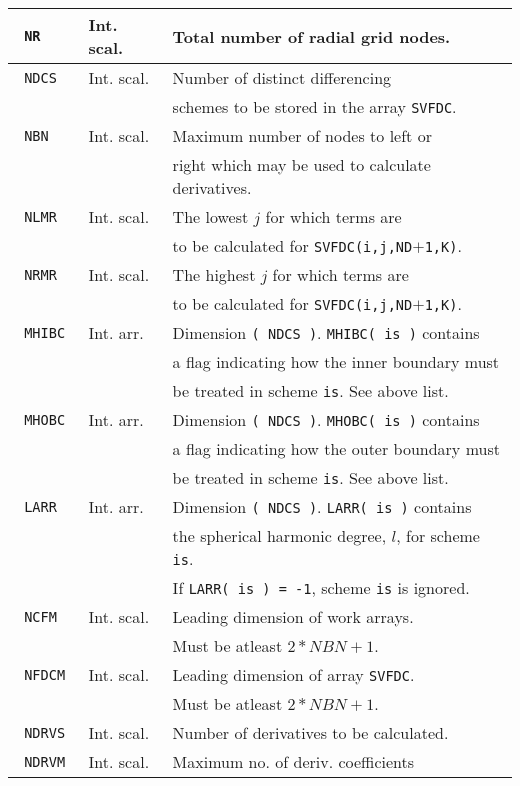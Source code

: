 \begin{tabular}{|l|l|l|}
\hline
\verb+ NR + & Int. scal. & Total number of radial grid nodes. \\
\hline
\verb+ NDCS + & Int. scal. & Number of distinct differencing \\
& & schemes to be stored in the array \verb+SVFDC+. \\
\hline
\verb+ NBN + & Int. scal. & Maximum number of nodes to left or \\
& & right which may be used to calculate derivatives. \\
\hline
\verb+ NLMR + & Int. scal. & The lowest $j$ for which terms are \\
& & to be calculated for \verb+SVFDC(i,j,ND+$+$\verb+1,K)+. \\
\hline
\verb+ NRMR + & Int. scal. & The highest $j$ for which terms are \\
& & to be calculated for \verb+SVFDC(i,j,ND+$+$\verb+1,K)+. \\
\hline
\verb+ MHIBC + & Int. arr. & Dimension \verb+( NDCS )+. \verb+MHIBC( is )+
contains \\
& & a flag indicating how the inner boundary must \\
& & be treated in scheme \verb+is+. See above list. \\
\hline
\verb+ MHOBC + & Int. arr. & Dimension \verb+( NDCS )+. \verb+MHOBC( is )+
contains \\
& & a flag indicating how the outer boundary must \\
& & be treated in scheme \verb+is+. See above list. \\
\hline
\verb+ LARR + & Int. arr. & Dimension \verb+( NDCS )+. \verb+LARR( is )+
contains \\
& & the spherical harmonic degree, $l$, for scheme \verb+is+. \\
& & If \verb+LARR( is ) = -1+, scheme \verb+is+ is ignored. \\
\hline
\verb+ NCFM + & Int. scal. & Leading dimension of work arrays. \\
& & Must be atleast $2*NBN + 1$. \\
\hline
\verb+ NFDCM + & Int. scal. & Leading dimension of array \verb+SVFDC+. \\
& & Must be atleast $2*NBN + 1$. \\
\hline
\verb+ NDRVS + & Int. scal. & Number of derivatives to be calculated. \\
\hline
\verb+ NDRVM + & Int. scal. & Maximum no. of deriv. coefficients \\

\end{tabular}
